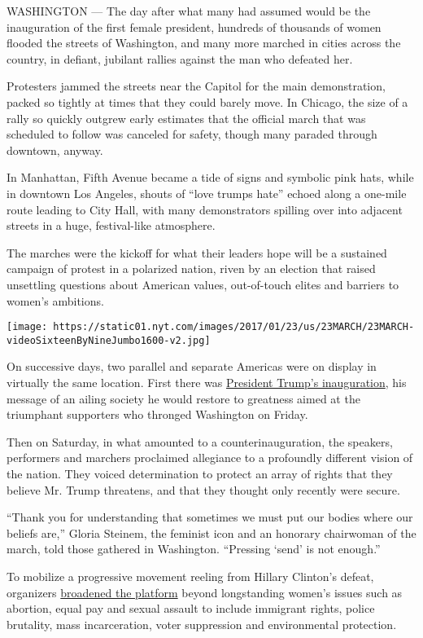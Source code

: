 WASHINGTON --- The day after what many had assumed would be the
inauguration of the first female president, hundreds of thousands of
women flooded the streets of Washington, and many more marched in cities
across the country, in defiant, jubilant rallies against the man who
defeated her.

Protesters jammed the streets near the Capitol for the main
demonstration, packed so tightly at times that they could barely move.
In Chicago, the size of a rally so quickly outgrew early estimates that
the official march that was scheduled to follow was canceled for safety,
though many paraded through downtown, anyway.

In Manhattan, Fifth Avenue became a tide of signs and symbolic pink
hats, while in downtown Los Angeles, shouts of ``love trumps hate''
echoed along a one-mile route leading to City Hall, with many
demonstrators spilling over into adjacent streets in a huge,
festival-like atmosphere.

The marches were the kickoff for what their leaders hope will be a
sustained campaign of protest in a polarized nation, riven by an
election that raised unsettling questions about American values,
out-of-touch elites and barriers to women's ambitions.

\texttt{[image: https://static01.nyt.com/images/2017/01/23/us/23MARCH/23MARCH-videoSixteenByNineJumbo1600-v2.jpg]}

On successive days, two parallel and separate Americas were on display
in virtually the same location. First there was
\href{https://www.nytimes.com/2017/01/20/us/politics/trump-inauguration-day.html}{President
Trump's inauguration}, his message of an ailing society he would restore
to greatness aimed at the triumphant supporters who thronged Washington
on Friday.

Then on Saturday, in what amounted to a counterinauguration, the
speakers, performers and marchers proclaimed allegiance to a profoundly
different vision of the nation. They voiced determination to protect an
array of rights that they believe Mr. Trump threatens, and that they
thought only recently were secure.

``Thank you for understanding that sometimes we must put our bodies
where our beliefs are,'' Gloria Steinem, the feminist icon and an
honorary chairwoman of the march, told those gathered in Washington.
``Pressing `send' is not enough.''

To mobilize a progressive movement reeling from Hillary Clinton's
defeat, organizers
\href{https://www.womensmarch.com/principles/}{broadened the platform}
beyond longstanding women's issues such as abortion, equal pay and
sexual assault to include immigrant rights, police brutality, mass
incarceration, voter suppression and environmental protection.

